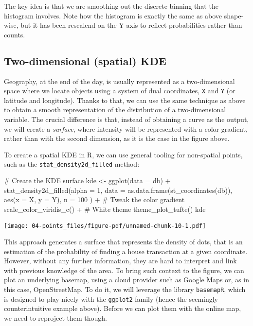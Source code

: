 \documentclass[
  letterpaper,
  DIV=11,
  numbers=noendperiod,
  oneside]{scrreprt}
\newenvironment{Shaded}{\begin{snugshade}}{\end{snugshade}}
\newcommand{\AttributeTok}[1]{\textcolor[rgb]{0.40,0.45,0.13}{#1}}
\newcommand{\CommentTok}[1]{\textcolor[rgb]{0.37,0.37,0.37}{#1}}
\newcommand{\DecValTok}[1]{\textcolor[rgb]{0.68,0.00,0.00}{#1}}
\newcommand{\FunctionTok}[1]{\textcolor[rgb]{0.28,0.35,0.67}{#1}}
\newcommand{\NormalTok}[1]{\textcolor[rgb]{0.00,0.23,0.31}{#1}}
\newcommand{\OtherTok}[1]{\textcolor[rgb]{0.00,0.23,0.31}{#1}}
\newcommand{\SpecialCharTok}[1]{\textcolor[rgb]{0.37,0.37,0.37}{#1}}
\begin{document}
The key idea is that we are smoothing out the discrete binning that the
histogram involves. Note how the histogram is exactly the same as above
shape-wise, but it has been rescalend on the Y axis to reflect
probabilities rather than counts.

\subsection{Two-dimensional (spatial)
KDE}\label{two-dimensional-spatial-kde}

Geography, at the end of the day, is usually represented as a
two-dimensional space where we locate objects using a system of dual
coordinates, \texttt{X} and \texttt{Y} (or latitude and longitude).
Thanks to that, we can use the same technique as above to obtain a
smooth representation of the distribution of a two-dimensional variable.
The crucial difference is that, instead of obtaining a curve as the
output, we will create a \emph{surface}, where intensity will be
represented with a color gradient, rather than with the second
dimension, as it is the case in the figure above.

To create a spatial KDE in R, we can use general tooling for non-spatial
points, such as the \texttt{stat\_density2d\_filled} method:

\begin{Shaded}
\begin{Highlighting}[]
\CommentTok{\# Create the KDE surface}
\NormalTok{kde }\OtherTok{\textless{}{-}} \FunctionTok{ggplot}\NormalTok{(}\AttributeTok{data =}\NormalTok{ db) }\SpecialCharTok{+}
  \FunctionTok{stat\_density2d\_filled}\NormalTok{(}\AttributeTok{alpha =} \DecValTok{1}\NormalTok{,}
    \AttributeTok{data =} \FunctionTok{as.data.frame}\NormalTok{(}\FunctionTok{st\_coordinates}\NormalTok{(db)), }
    \FunctionTok{aes}\NormalTok{(}\AttributeTok{x =}\NormalTok{ X, }\AttributeTok{y =}\NormalTok{ Y),}
    \AttributeTok{n =} \DecValTok{100}
\NormalTok{  ) }\SpecialCharTok{+}
  \CommentTok{\# Tweak the color gradient}
  \FunctionTok{scale\_color\_viridis\_c}\NormalTok{() }\SpecialCharTok{+}
  \CommentTok{\# White theme}
  \FunctionTok{theme\_plot\_tufte}\NormalTok{() }
\NormalTok{kde}
\end{Highlighting}
\end{Shaded}

\texttt{[image: 04-points\_files/figure-pdf/unnamed-chunk-10-1.pdf]}

This approach generates a surface that represents the density of dots,
that is an estimation of the probability of finding a house transaction
at a given coordinate. However, without any further information, they
are hard to interpret and link with previous knowledge of the area. To
bring such context to the figure, we can plot an underlying basemap,
using a cloud provider such as Google Maps or, as in this case,
OpenStreetMap. To do it, we will leverage the library \texttt{basemapR},
which is designed to play nicely with the \texttt{ggplot2} family (hence
the seemingly counterintuitive example above). Before we can plot them
with the online map, we need to reproject them though.
\end{document}
